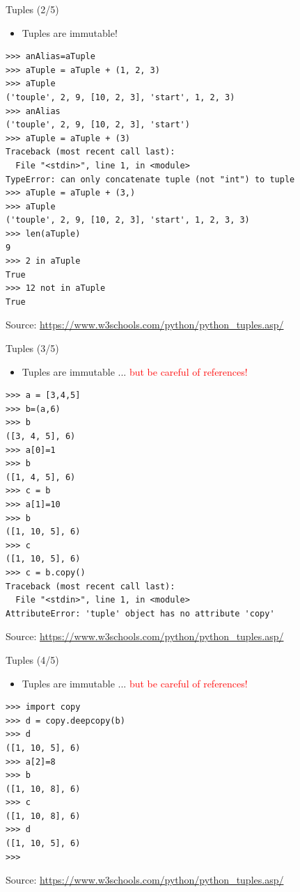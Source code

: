 \documentclass{beamer}
\begin{document}
\begin{frame}[fragile]
{\centerline{Tuples (2/5)}}
\begin{itemize}
    \item Tuples are immutable!
\end{itemize}
\begin{lstlisting}[style=myPythonStyle]
>>> anAlias=aTuple
>>> aTuple = aTuple + (1, 2, 3)
>>> aTuple
('touple', 2, 9, [10, 2, 3], 'start', 1, 2, 3)
>>> anAlias
('touple', 2, 9, [10, 2, 3], 'start')
>>> aTuple = aTuple + (3)
Traceback (most recent call last):
  File "<stdin>", line 1, in <module>
TypeError: can only concatenate tuple (not "int") to tuple
>>> aTuple = aTuple + (3,)
>>> aTuple
('touple', 2, 9, [10, 2, 3], 'start', 1, 2, 3, 3)
>>> len(aTuple)
9
>>> 2 in aTuple
True
>>> 12 not in aTuple
True

\end{lstlisting}


\begin{center}
\tiny Source: \url{https://www.w3schools.com/python/python_tuples.asp/}
\end{center}

\end{frame}

\begin{frame}[fragile]
{\centerline{Tuples (3/5)}}
\begin{itemize}
    \item Tuples are immutable ... \textcolor{red}{but be careful of references!}
\end{itemize}
\begin{lstlisting}[style=myPythonStyle]
>>> a = [3,4,5]
>>> b=(a,6)
>>> b
([3, 4, 5], 6)
>>> a[0]=1
>>> b
([1, 4, 5], 6)
>>> c = b
>>> a[1]=10
>>> b
([1, 10, 5], 6)
>>> c
([1, 10, 5], 6)
>>> c = b.copy()
Traceback (most recent call last):
  File "<stdin>", line 1, in <module>
AttributeError: 'tuple' object has no attribute 'copy'
\end{lstlisting}


\begin{center}
\tiny Source: \url{https://www.w3schools.com/python/python_tuples.asp/}
\end{center}

\end{frame}

\begin{frame}[fragile]
{\centerline{Tuples (4/5)}}
\begin{itemize}
    \item Tuples are immutable ... \textcolor{red}{but be careful of references!}
\end{itemize}
\begin{lstlisting}[style=myPythonStyle]
>>> import copy
>>> d = copy.deepcopy(b)
>>> d
([1, 10, 5], 6)
>>> a[2]=8
>>> b
([1, 10, 8], 6)
>>> c
([1, 10, 8], 6)
>>> d
([1, 10, 5], 6)
>>> 
\end{lstlisting}


\begin{center}
\tiny Source: \url{https://www.w3schools.com/python/python_tuples.asp/}
\end{center}

\end{frame}
\end{document}
